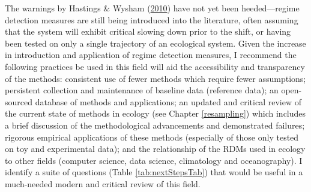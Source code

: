 \documentclass[12pt,twoside,openany]{reedthesis}
\begin{document}
The warnings by Hastings \& Wysham (\protect\hyperlink{ref-hastings2010regime}{2010}) have not yet been heeded---regime detection measures are still being introduced into the literature, often assuming that the system will exhibit critical slowing down prior to the shift, or having been tested on only a single trajectory of an ecological system. Given the increase in introduction and application of regime detection measures, I recommend the following practices be used in this field will aid the accessibility and transparency of the methods: consistent use of fewer methods which require fewer assumptions; persistent collection and maintenance of baseline data (reference data); an open-sourced database of methods and applications; an updated and critical review of the current state of methods in ecology (see Chapter \ref{resampling}) which includes a brief discussion of the methodological advancements and demonstrated failures; rigorous empirical applications of these methods (especially of those only tested on toy and experimental data); and the relationship of the RDMs used in ecology to other fields (computer science, data science, climatology and oceanography). I identify a suite of questions (Table \ref{tab:nextStepsTab}) that would be useful in a much-needed modern and critical review of this field.
\end{document}
